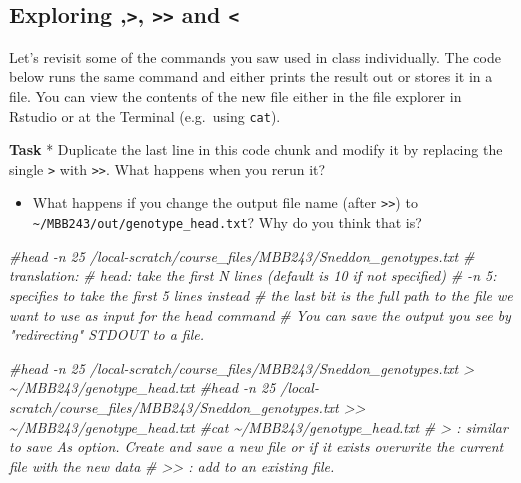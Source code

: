 \documentclass[
]{article}
\newenvironment{Shaded}{\begin{snugshade}}{\end{snugshade}}
\newcommand{\CommentTok}[1]{\textcolor[rgb]{0.56,0.35,0.01}{\textit{#1}}}
\providecommand{\tightlist}{%
  \setlength{\itemsep}{0pt}\setlength{\parskip}{0pt}}
\begin{document}
\hypertarget{exploring-and}{%
\subsection{\texorpdfstring{Exploring
\texttt{\textbar{}},\texttt{\textgreater{}},
\texttt{\textgreater{}\textgreater{}} and
\texttt{\textless{}}}{Exploring \textbar,\textgreater, \textgreater\textgreater{} and \textless{}}}\label{exploring-and}}

Let's revisit some of the commands you saw used in class individually.
The code below runs the same command and either prints the result out or
stores it in a file. You can view the contents of the new file either in
the file explorer in Rstudio or at the Terminal (e.g.~using
\texttt{cat}).

\textbf{Task} * Duplicate the last line in this code chunk and modify it
by replacing the single \texttt{\textgreater{}} with
\texttt{\textgreater{}\textgreater{}}. What happens when you rerun it?

\begin{itemize}
\tightlist
\item
  What happens if you change the output file name (after
  \texttt{\textgreater{}\textgreater{}}) to
  \texttt{\textasciitilde{}/MBB243/out/genotype\_head.txt}? Why do you
  think that is?
\end{itemize}

\begin{Shaded}
\begin{Highlighting}[]
\CommentTok{\#head {-}n 25  /local{-}scratch/course\_files/MBB243/Sneddon\_genotypes.txt}
\CommentTok{\# translation:}
\CommentTok{\# head: take the first N lines (default is 10 if not specified)}
\CommentTok{\# {-}n 5: specifies to take the first 5 lines instead}
\CommentTok{\# the last bit is the full path to the file we want to use as input for the head command}
\CommentTok{\# You can save the output you see by "redirecting" STDOUT to a file. }

\CommentTok{\#head {-}n 25 /local{-}scratch/course\_files/MBB243/Sneddon\_genotypes.txt \textgreater{} \textasciitilde{}/MBB243/genotype\_head.txt}
\CommentTok{\#head {-}n 25 /local{-}scratch/course\_files/MBB243/Sneddon\_genotypes.txt \textgreater{}\textgreater{} \textasciitilde{}/MBB243/genotype\_head.txt}
\CommentTok{\#cat \textasciitilde{}/MBB243/genotype\_head.txt}
\CommentTok{\# \textgreater{} : similar to save As option. Create and save a new file or if it exists overwrite the current file with the new data}
\CommentTok{\# \textgreater{}\textgreater{} : add to an existing file. }
\end{Highlighting}
\end{Shaded}
\end{document}
